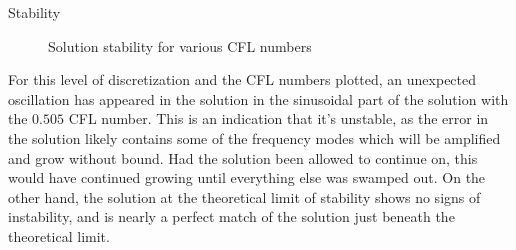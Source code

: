 \documentclass{article}
\begin{document}
\begin{section}{Stability}
\begin{figure}[ht]
  \caption{Solution stability for various CFL numbers}
  \label{stability}
\end{figure}

For this level of discretization and the CFL numbers plotted,
an unexpected oscillation has appeared in the solution in the
sinusoidal part of the solution with the $0.505$ CFL number.
This is an indication that it's unstable, as the error in the solution
likely contains some of the frequency modes which will be amplified and grow without bound.
Had the solution been allowed to continue on,
this would have continued growing until everything else was swamped out.
On the other hand, the solution at the theoretical limit of stability shows no signs of instability,
and is nearly a perfect match of the solution just beneath the theoretical limit.

\end{section}
\end{document}
